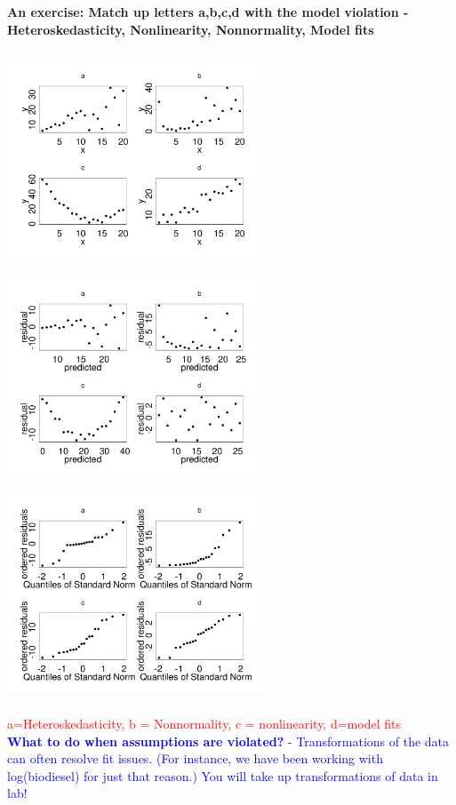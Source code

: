 \textbf{An exercise: Match up letters a,b,c,d with the model violation - Heteroskedasticity, Nonlinearity, Nonnormality, Model fits}
\begin{center}
\includegraphics[height=2.5in,width=3in]{ybyx_handout.pdf}
\includegraphics[height=2.5in,width=3in]{resbypred_handout.pdf}
\includegraphics[height=2.5in,width=3in]{qqnorm_handout.pdf}
\end{center}

\textcolor{red}{a=Heteroskedasticity, b = Nonnormality, c = nonlinearity, d=model fits}\\

\textcolor{blue}{\textbf{What to do when assumptions are violated?} - Transformations of the data can often resolve fit issues.  (For instance, we have been working with log(biodiesel) for just that reason.)  You will take up transformations of data in lab!}\\~\\~\\


